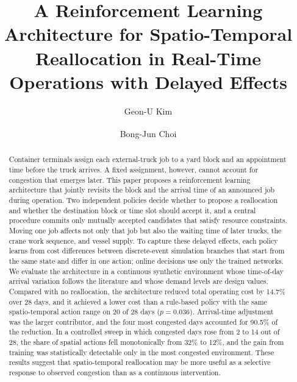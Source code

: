\documentclass[a4paper]{llncs}
\begin{document}
\raggedbottom

\title{A Reinforcement Learning Architecture for Spatio-Temporal
Reallocation in Real-Time Operations with Delayed Effects}

\author{Geon-U Kim \and Bong-Jun Choi\textsuperscript{\Letter}}

\maketitle

\begin{abstract}
Container terminals assign each external-truck job to a yard block and
an appointment time before the truck arrives. A fixed assignment,
however, cannot account for congestion that emerges later. This paper
proposes a reinforcement learning architecture that jointly revisits the
block and the arrival time of an announced job during operation. Two
independent policies decide whether to propose a reallocation and
whether the destination block or time slot should accept it, and a
central procedure commits only mutually accepted candidates that satisfy
resource constraints. Moving one job affects not only that job but also
the waiting time of later trucks, the crane work sequence, and vessel
supply. To capture these delayed effects, each policy learns from cost
differences between discrete-event simulation branches that start from
the same state and differ in one action; online decisions use only the
trained networks. We evaluate the architecture in a continuous synthetic
environment whose time-of-day arrival variation follows the literature
and whose demand levels are design values. Compared with no
reallocation, the architecture reduced total operating cost by 14.7\%
over 28 days, and it achieved a lower cost than a rule-based policy with
the same spatio-temporal action range on 20 of 28 days ($p=0.036$).
Arrival-time adjustment was the larger contributor, and the four most
congested days accounted for 90.5\% of the reduction. In a controlled
sweep in which congested days rose from 2 to 14 out of 28, the share of
spatial actions fell monotonically from 32\% to 12\%, and the gain from
training was statistically detectable only in the most congested
environment. These results suggest that spatio-temporal reallocation may
be more useful as a selective response to observed congestion than as a
continuous intervention.

\end{abstract}
\end{document}
